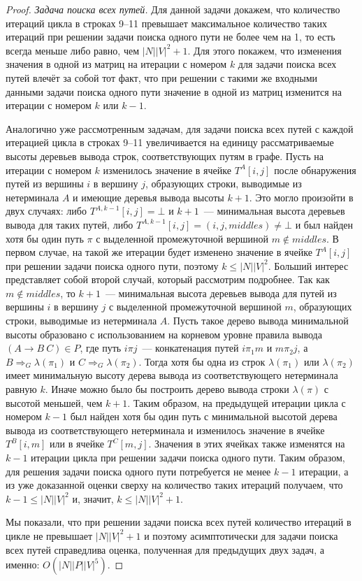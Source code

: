 \begin{proof}
\textit{Задача поиска всех путей.} Для данной задачи докажем, что количество итераций цикла в строках 9--11 превышает максимальное количество таких итераций при решении задачи поиска одного пути не более чем на 1, то есть всегда меньше либо равно, чем $|N||V|^2 + 1$. Для этого покажем, что изменения значения в одной из матриц на итерации с номером $k$ для задачи поиска всех путей влечёт за собой тот факт, что при решении с такими же входными данными задачи поиска одного пути значение в одной из матриц изменится на итерации с номером $k$ или $k - 1$.

Аналогично уже рассмотренным задачам, для задачи поиска всех путей с каждой итерацией цикла в строках 9--11 увеличивается на единицу рассматриваемые высоты деревьев вывода строк, соответствующих путям в графе. Пусть на итерации с номером $k$ изменилось значение в ячейке $T^{A}[i, j]$ после обнаружения путей из вершины $i$ в вершину $j$, образующих строки, выводимые из нетерминала $A$ и имеющие деревья вывода высоты $k + 1$. Это могло произойти в двух случаях: либо $T^{A, k - 1}[i, j] = \bot$ и $k + 1$~--- минимальная высота деревьев вывода для таких путей, либо $T^{A, k - 1}[i, j] = (i, j, \textit{middles}) \neq \bot$ и был найден хотя бы один путь $\pi$ с выделенной промежуточной вершиной $m \notin \textit{middles}$. В первом случае, на такой же итерации будет изменено значение в ячейке $T^{A}[i, j]$ при решении задачи поиска одного пути, поэтому $k \leq |N||V|^2$. Больший интерес представляет собой второй случай, который рассмотрим подробнее. Так как $m \notin \textit{middles}$, то $k + 1$~--- минимальная высота деревьев вывода для путей из вершины $i$ в вершину $j$ с выделенной промежуточной вершиной $m$, образующих строки, выводимые из нетерминала $A$. Пусть такое дерево вывода минимальной высоты образовано с использованием на корневом уровне правила вывода $(A \to B \ C) \in P$, где путь $i \pi j$~--- конкатенация путей $i \pi_1 m$ и $m \pi_2 j$, а $B \Rightarrow_G \lambda(\pi_1)$ и $C \Rightarrow_G \lambda(\pi_2)$. Тогда хотя бы одна из строк $\lambda(\pi_1)$ или $\lambda(\pi_2)$ имеет минимальную высоту дерева вывода из соответствующего нетерминала равную $k$. Иначе можно было бы построить дерево вывода строки $\lambda(\pi)$ с высотой меньшей, чем $k + 1$. Таким образом, на предыдущей итерации цикла с номером $k - 1$ был найден хотя бы один путь с минимальной высотой дерева вывода из соответствующего нетерминала и изменилось значение в ячейке $T^{B}[i, m]$ или в ячейке $T^{C}[m, j]$. Значения в этих ячейках также изменятся на $k - 1$ итерации цикла при решении задачи поиска одного пути. Таким образом, для решения задачи поиска одного пути потребуется не менее $k - 1$ итерации, а из уже доказанной оценки сверху на количество таких итераций получаем, что $k - 1 \leq |N||V|^2$ и, значит, $k \leq |N||V|^2 + 1$.

Мы показали, что при решении задачи поиска всех путей количество итераций в цикле не превышает $|N||V|^2 + 1$ и поэтому асимптотически для задачи поиска всех путей справедлива оценка, полученная для предыдущих двух задач, а именно: $O(|N||P||V|^5)$.
\end{proof}

